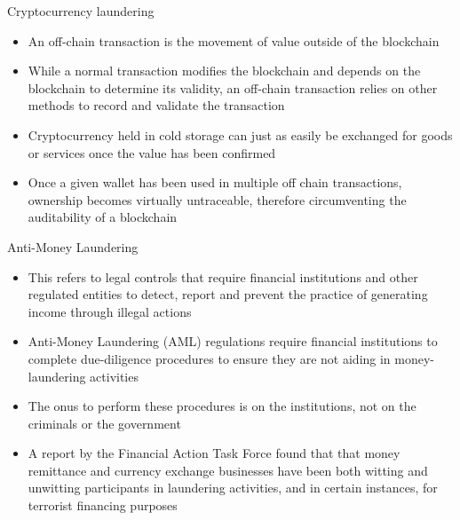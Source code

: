\documentclass[9pt]{beamer}
\begin{document}
\begin{frame}{Cryptocurrency laundering}
	\begin{itemize}
		\item An off-chain transaction is the movement of value outside of the blockchain
		\item While a normal transaction modifies the blockchain and depends on the blockchain to determine its validity, an off-chain transaction relies on other methods to record and validate the transaction
		\item Cryptocurrency held in cold storage can just as easily be exchanged for goods or services once the value has been confirmed
		\item Once a given wallet has been used in multiple off chain transactions, ownership becomes virtually untraceable, therefore circumventing the auditability of a blockchain
	\end{itemize}
\end{frame}


\begin{frame}{Anti-Money Laundering}
	\begin{itemize}
		\item This refers to legal controls that require financial institutions and other regulated entities to detect, report and prevent the practice of generating income through illegal actions
		\item Anti-Money Laundering (AML) regulations require financial institutions to complete due-diligence procedures to ensure they are not aiding in money-laundering activities
		\item The onus to perform these procedures is on the institutions, not on the criminals or the government
		\item A report by the Financial Action Task Force found that that money remittance and currency exchange businesses have been both witting and unwitting participants in laundering activities, and in certain instances, for terrorist financing purposes
	\end{itemize}
\end{frame}


\end{document}
